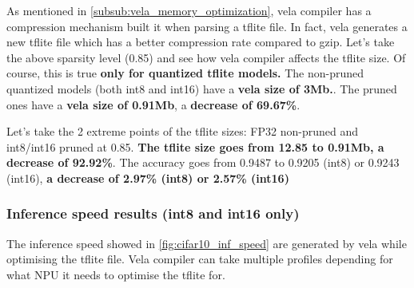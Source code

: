 As mentioned in \autoref{subsub:vela_memory_optimization}, vela compiler has a
compression mechanism built it when parsing a tflite file. In fact, vela
generates a new tflite file which has a better compression rate compared to
gzip. Let's take the above sparsity level (0.85) and see how vela compiler
affects the tflite size. Of course, this is true \textbf{only for quantized
tflite models.}
The non-pruned quantized models (both int8 and int16) have a \textbf{vela size
of 3Mb.}. The pruned ones have a \textbf{vela size of 0.91Mb}, a \textbf{
decrease of 69.67\%}.

Let's take the 2 extreme points of the tflite sizes: FP32 non-pruned and
int8/int16 pruned at 0.85. \textbf{The tflite size goes from 12.85 to 0.91Mb,
a decrease of 92.92\%}. The accuracy goes from 0.9487 to 0.9205
(int8) or 0.9243 (int16), \textbf{a decrease of 2.97\% (int8) or 2.57\% (int16)}

\subsubsection{Inference speed results (int8 and int16 only)}
The inference speed showed in \autoref{fig:cifar10_inf_speed} are generated by
vela while optimising the tflite file. Vela compiler can take multiple profiles
depending for what NPU it needs to optimise the tflite for.

